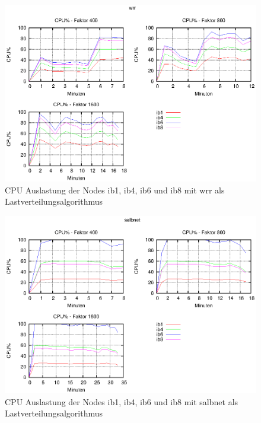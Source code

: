 \documentclass[a4paper, 12pt, BCOR10mm, DIV12, toc=bibliography, toc=listof, german]{scrbook}
\begin{document}
			\begin{figure}
				\centering
				\includegraphics[width=13cm]{plots/cpu-wrr}
				\caption{CPU Auslastung der Nodes ib1, ib4, ib6 und ib8 mit wrr als
				Lastverteilungsalgorithmus}
				\label{fig:cpu-wrr}
			\end{figure}

			\begin{figure}
				\centering
				\includegraphics[width=13cm]{plots/cpu-salbnet}
				\caption{CPU Auslastung der Nodes ib1, ib4, ib6 und ib8 mit salbnet als
				Lastverteilungsalgorithmus}
				\label{fig:cpu-salbnet}
			\end{figure}
\end{document}

